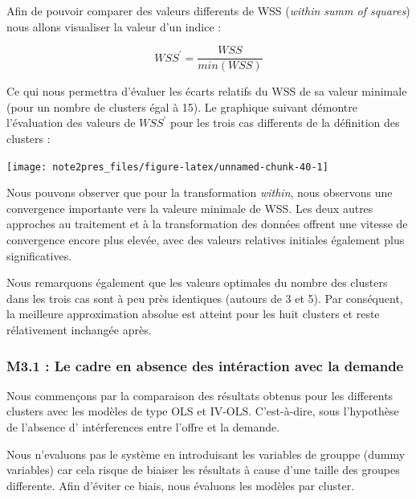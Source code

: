 \documentclass[11pt,]{article}
\begin{document}
Afin de pouvoir comparer des valeurs differents de WSS (\emph{within
summ of squares}) nous allons visualiser la valeur d'un indice :

\begin{equation*}
    WSS^{'} = \frac{WSS}{min(WSS)}
\end{equation*}

Ce qui nous permettra d'évaluer les écarts relatifs du WSS de sa valeur
minimale (pour un nombre de clusters égal à 15). Le graphique suivant
démontre l'évaluation des valeurs de \(WSS^{'}\) pour les trois cas
differents de la définition des clusters :

\FloatBarrier

\begin{center}\texttt{[image: note2pres\_files/figure-latex/unnamed-chunk-40-1]} \end{center}

\FloatBarrier

Nous pouvons observer que pour la transformation \emph{within}, nous
observons une convergence importante vers la valeure minimale de WSS.
Les deux autres approches au traitement et à la transformation des
données offrent une vitesse de convergence encore plus elevée, avec des
valeurs relatives initiales également plus significatives.

Nous remarquons également que les valeurs optimales du nombre des
clusters dans les trois cas sont à peu près identiques (autours de 3 et
5). Par conséquent, la meilleure approximation absolue est atteint pour
les huit clusters et reste rélativement inchangée après.

\hypertarget{m3.1-le-cadre-en-absence-des-interaction-avec-la-demande}{%
\subsubsection{M3.1 : Le cadre en absence des intéraction avec la
demande}\label{m3.1-le-cadre-en-absence-des-interaction-avec-la-demande}}

Nous commençons par la comparaison des résultats obtenus pour les
differents clusters avec les modèles de type OLS et IV-OLS.
C'est-à-dire, sous l'hypothèse de l'absence d' intérferences entre
l'offre et la demande.

Nous n'evaluons pas le système en introduisant les variables de grouppe
(dummy variables) car cela risque de biaiser les résultats à cause d'une
taille des groupes differente. Afin d'éviter ce biais, nous évaluons les
modèles par cluster.
\end{document}
